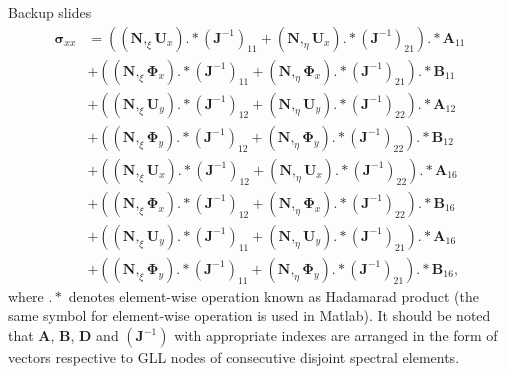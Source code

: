 \documentclass[10pt]{beamer} %
\renewcommand{\vec}[1]{\mathbf{#1}}
\newcommand{\bm}[1]{\mathbf{#1}}
\newcommand{\bs}[1]{\boldsymbol{#1}}
\begin{document}
\begin{frame}{Backup slides}
  \begin{equation*}
  \begin{split}
  \bs{\sigma}_{xx}&=\left((\bm{N},_{\xi}\vec{U}_x).*(\vec{J}^{-1})_{11}+(\bm{N},_{\eta}\vec{U}_x).*(\vec{J}^{-1})_{21}\right).*\vec{A}_{11}\\
  &+\left((\bm{N},_{\xi}\bs{\Phi}_x).*(\vec{J}^{-1})_{11}+(\bm{N},_{\eta}\bs{\Phi}_x).*(\vec{J}^{-1})_{21}\right).*\vec{B}_{11}\\
  &+\left((\bm{N},_{\xi}\vec{U}_y).*(\vec{J}^{-1})_{12}+(\bm{N},_{\eta}\vec{U}_y).*(\vec{J}^{-1})_{22}\right).*\vec{A}_{12}\\
  &+\left((\bm{N},_{\xi}\bs{\Phi}_y).*(\vec{J}^{-1})_{12}+(\bm{N},_{\eta}\bs{\Phi}_y).*(\vec{J}^{-1})_{22}\right).*\vec{B}_{12}\\
  &+\left((\bm{N},_{\xi}\vec{U}_x).*(\vec{J}^{-1})_{12}+(\bm{N},_{\eta}\vec{U}_x).*(\vec{J}^{-1})_{22}\right).*\vec{A}_{16}\\
  &+\left((\bm{N},_{\xi}\bs{\Phi}_x).*(\vec{J}^{-1})_{12}+(\bm{N},_{\eta}\bs{\Phi}_x).*(\vec{J}^{-1})_{22}\right).*\vec{B}_{16}\\
  &+\left((\bm{N},_{\xi}\vec{U}_y).*(\vec{J}^{-1})_{11}+(\bm{N},_{\eta}\vec{U}_y).*(\vec{J}^{-1})_{21}\right).*\vec{A}_{16}\\
  &+\left((\bm{N},_{\xi}\bs{\Phi}_y).*(\vec{J}^{-1})_{11}+(\bm{N},_{\eta}\bs{\Phi}_y).*(\vec{J}^{-1})_{21}\right).*\vec{B}_{16},
  \end{split}
  \end{equation*}
  where $.*$ denotes element-wise operation known as Hadamarad product (the same symbol for element-wise operation is used in Matlab). It should be noted that $\vec{A}$, $\vec{B}$, $\vec{D}$ and $(\vec{J}^{-1})$ with appropriate indexes are arranged in the form of vectors respective to GLL nodes of consecutive disjoint spectral elements.
\end{frame}
\end{document}
